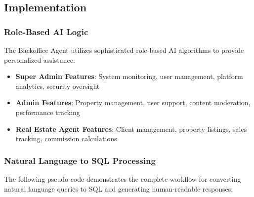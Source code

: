 \subsection{Implementation}
\subsubsection{Role-Based AI Logic}
The Backoffice Agent utilizes sophisticated role-based AI algorithms to provide personalized assistance:

\begin{itemize}
    \item \textbf{Super Admin Features}: System monitoring, user management, platform analytics, security oversight
    \item \textbf{Admin Features}: Property management, user support, content moderation, performance tracking
    \item \textbf{Real Estate Agent Features}: Client management, property listings, sales tracking, commission calculations
\end{itemize}

\subsubsection*{Natural Language to SQL Processing}
The following pseudo code demonstrates the complete workflow for converting natural language queries to SQL and generating human-readable responses:

